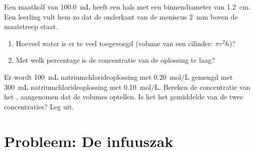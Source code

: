 \begin{exercise}[$\star\star\star$]\label{exo:g10:concentration-and-dilution:14}
Een maatkolf van \qty{100.0}{mL} heeft een hals met een binnendiameter
van \qty{1.2}{cm}. Een leerling vult hem zo dat de onderkant van de
meniscus \qty{2}{mm} boven de maatstreep staat.
\begin{enumerate}
  \item Hoeveel water is er te veel toegevoegd (volume van een cilinder:
        $\pi r^2 h$)?
  \item Met welk percentage is de concentratie van de oplossing te laag?
\end{enumerate}
\end{exercise}

\begin{exercise}[$\star\star\star$]\label{exo:g10:concentration-and-dilution:15}
Er wordt \qty{100}{mL} natriumchlorideoplossing met \qty{0.20}{mol/L}
gemengd met \qty{300}{mL} natriumchlorideoplossing met
\qty{0.10}{mol/L}. Bereken de concentratie van het , aangenomen
dat de volumes optellen. Is het het gemiddelde van de twee
concentraties? Leg uit.
\end{exercise}

\section{Probleem: De infuuszak}

